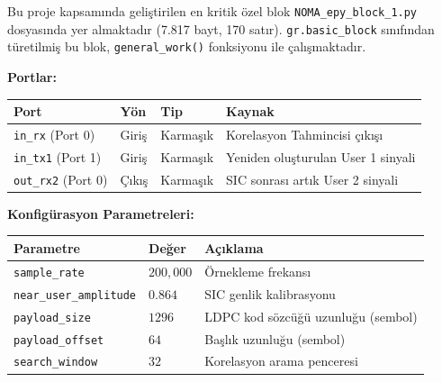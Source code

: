 \documentclass[
]{IEEEtran}
\newcounter{none} %
\begin{document}
Bu proje kapsamında geliştirilen en kritik özel blok
\texttt{NOMA\_epy\_block\_1.py} dosyasında yer almaktadır (7.817 bayt,
170 satır). \texttt{gr.basic\_block} sınıfından türetilmiş bu blok,
\texttt{general\_work()} fonksiyonu ile çalışmaktadır.

\textbf{Portlar:}

{\def\LTcaptype{none} %
\begin{longtable}[]{@{}
  >{\raggedright\arraybackslash}p{}
  >{\raggedright\arraybackslash}p{}
  >{\raggedright\arraybackslash}p{}
  >{\raggedright\arraybackslash}p{}@{}}
\toprule\noalign{}
\begin{minipage}[b]{\linewidth}\raggedright
Port
\end{minipage} & \begin{minipage}[b]{\linewidth}\raggedright
Yön
\end{minipage} & \begin{minipage}[b]{\linewidth}\raggedright
Tip
\end{minipage} & \begin{minipage}[b]{\linewidth}\raggedright
Kaynak
\end{minipage} \\
\midrule\noalign{}
\endhead
\bottomrule\noalign{}
\endlastfoot
\texttt{in\_rx} (Port 0) & Giriş & Karmaşık & Korelasyon Tahmincisi
çıkışı \\
\texttt{in\_tx1} (Port 1) & Giriş & Karmaşık & Yeniden oluşturulan User
1 sinyali \\
\texttt{out\_rx2} (Port 0) & Çıkış & Karmaşık & SIC sonrası artık User 2
sinyali \\
\end{longtable}
}

\textbf{Konfigürasyon Parametreleri:}

{\def\LTcaptype{none} %
\begin{longtable}[]{@{}lll@{}}
\toprule\noalign{}
Parametre & Değer & Açıklama \\
\midrule\noalign{}
\endhead
\bottomrule\noalign{}
\endlastfoot
\texttt{sample\_rate} & \(200{,}000\) & Örnekleme frekansı \\
\texttt{near\_user\_amplitude} & \(0.864\) & SIC genlik kalibrasyonu \\
\texttt{payload\_size} & \(1296\) & LDPC kod sözcüğü uzunluğu
(sembol) \\
\texttt{payload\_offset} & \(64\) & Başlık uzunluğu (sembol) \\
\texttt{search\_window} & \(32\) & Korelasyon arama penceresi \\
\end{longtable}
}
\end{document}
